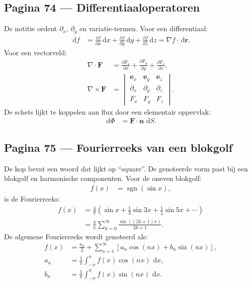 \documentclass[11pt]{article}
\newcommand{\dd}{\,\mathrm{d}}
\newcommand{\pd}[2]{\frac{\partial #1}{\partial #2}}
\newcommand{\vect}[1]{\mathbf{#1}}
\begin{document}
\subsection*{Pagina 74 --- Differentiaaloperatoren}

De notitie ordent $\partial_x$, $\partial_y$ en variatie-termen. Voor een differentiaal:
\begin{align*}
\dd f
&=
\pd{f}{x}\dd x
+
\pd{f}{y}\dd y
+
\pd{f}{z}\dd z
=
\nabla f\cdot \dd\vect{r}.
\end{align*}
Voor een vectorveld:
\begin{align*}
\nabla\cdot\vect{F}
&=
\pd{F_x}{x}+\pd{F_y}{y}+\pd{F_z}{z},\\
\nabla\times\vect{F}
&=
\begin{vmatrix}
\vect{e}_x & \vect{e}_y & \vect{e}_z\\
\partial_x & \partial_y & \partial_z\\
F_x & F_y & F_z
\end{vmatrix}.
\end{align*}
De schets lijkt te koppelen aan flux door een elementair oppervlak:
\begin{align*}
\dd \Phi
&=
\vect{F}\cdot\vect{n}\,\dd S.
\end{align*}

\subsection*{Pagina 75 --- Fourierreeks van een blokgolf}

De kop bevat een woord dat lijkt op ``square''. De genoteerde vorm past bij een blokgolf en harmonische componenten. Voor de oneven blokgolf:
\begin{align*}
f(x)
&=
\operatorname{sgn}(\sin x),
\end{align*}
is de Fourierreeks:
\begin{align*}
f(x)
&=
\frac{4}{\pi}
\left(
\sin x
+
\frac{1}{3}\sin 3x
+
\frac{1}{5}\sin 5x
+\cdots
\right)\\
&=
\frac{4}{\pi}
\sum_{k=0}^{\infty}
\frac{\sin\left((2k+1)x\right)}{2k+1}.
\end{align*}
De algemene Fourierreeks wordt genoteerd als:
\begin{align*}
f(x)
&=
\frac{a_0}{2}
+
\sum_{n=1}^{\infty}
\left[
a_n\cos(nx)+b_n\sin(nx)
\right],\\
a_n
&=
\frac{1}{\pi}\int_{-\pi}^{\pi} f(x)\cos(nx)\,\dd x,\\
b_n
&=
\frac{1}{\pi}\int_{-\pi}^{\pi} f(x)\sin(nx)\,\dd x.
\end{align*}
\end{document}
